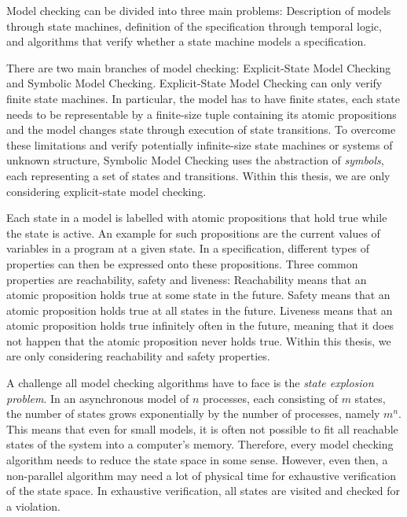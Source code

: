 \documentclass[
fancyheadings, %
%
%
]{stsreprt}
\begin{document}
Model checking can be divided into three main problems:
Description of models through state machines, definition of the specification through temporal logic, and algorithms that verify whether a state machine models a specification.

There are two main branches of model checking:
Explicit-State Model Checking and Symbolic Model Checking.
Explicit-State Model Checking can only verify finite state machines.
In particular, the model has to have finite states, each state needs to be representable by a finite-size tuple containing its atomic propositions and the model changes state through execution of state transitions.
To overcome these limitations and verify potentially infinite-size state machines or systems of unknown structure, Symbolic Model Checking uses the abstraction of \emph{symbols}, each representing a set of states and transitions.
Within this thesis, we are only considering explicit-state model checking.

Each state in a model is labelled with atomic propositions that hold true while the state is active.
An example for such propositions are the current values of variables in a program at a given state.
In a specification, different types of properties can then be expressed onto these propositions.
Three common properties are reachability, safety and liveness:
Reachability means that an atomic proposition holds true at some state in the future.
Safety means that an atomic proposition holds true at all states in the future.
Liveness means that an atomic proposition holds true infinitely often in the future, meaning that it does not happen that the atomic proposition never holds true.
Within this thesis, we are only considering reachability and safety properties.

A challenge all model checking algorithms have to face is the \emph{state explosion problem}.
In an asynchronous model of $n$ processes, each consisting of $m$ states, the number of states grows exponentially by the number of processes, namely $m^n$.
This means that even for small models, it is often not possible to fit all reachable states of the system into a computer's memory.
Therefore, every model checking algorithm needs to reduce the state space in some sense.
However, even then, a non-parallel algorithm may need a lot of physical time for exhaustive verification of the state space.
In exhaustive verification, all states are visited and checked for a violation.
\cite{Clarke2018.Introduction-to-Model-Checking,Holzmann2018.Explicit-State-Model-Checking}
\end{document}
